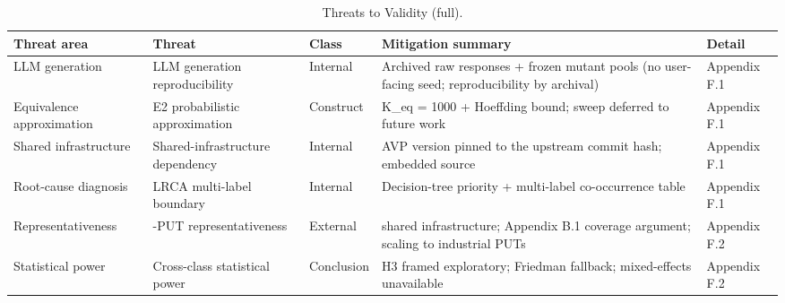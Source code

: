 \documentclass[manuscript,screen,review]{acmart}
\begin{document}
{%
\begin{longtable}[]{@{}
  >{\raggedright\arraybackslash}p{}
  >{\raggedright\arraybackslash}p{}
  >{\raggedright\arraybackslash}p{}
  >{\raggedright\arraybackslash}p{}
  >{\raggedright\arraybackslash}p{}@{}}
\caption{Threats to Validity (full).}\label{tab:p2-14-full}\\
\toprule\noalign{}
\begin{minipage}[b]{\linewidth}\raggedright
Threat area
\end{minipage} & \begin{minipage}[b]{\linewidth}\raggedright
Threat
\end{minipage} & \begin{minipage}[b]{\linewidth}\raggedright
Class
\end{minipage} & \begin{minipage}[b]{\linewidth}\raggedright
Mitigation summary
\end{minipage} & \begin{minipage}[b]{\linewidth}\raggedright
Detail
\end{minipage} \\
\midrule\noalign{}
\endfirsthead
\endhead
\bottomrule\noalign{}
\endlastfoot
LLM generation & LLM generation reproducibility & Internal & Archived raw responses
+ frozen mutant pools (no user-facing seed; reproducibility by archival) & Appendix F.1 \\
Equivalence approximation & E2 probabilistic approximation & Construct & K\_eq = 1000 +
Hoeffding bound; sweep deferred to future work & Appendix F.1 \\
Shared infrastructure & Shared-infrastructure dependency & Internal & AVP version pinned to the upstream
commit hash; embedded source & Appendix F.1 \\
Root-cause diagnosis & LRCA multi-label boundary & Internal & Decision-tree priority +
multi-label co-occurrence table & Appendix F.1 \\
Representativeness & 12-PUT representativeness & External & shared infrastructure; Appendix B.1
coverage argument; scaling to industrial PUTs & Appendix F.2 \\
Statistical power & Cross-class statistical power & Conclusion & H3 framed exploratory;
Friedman fallback; mixed-effects unavailable & Appendix F.2 \\

\end{longtable}}
\end{document}
